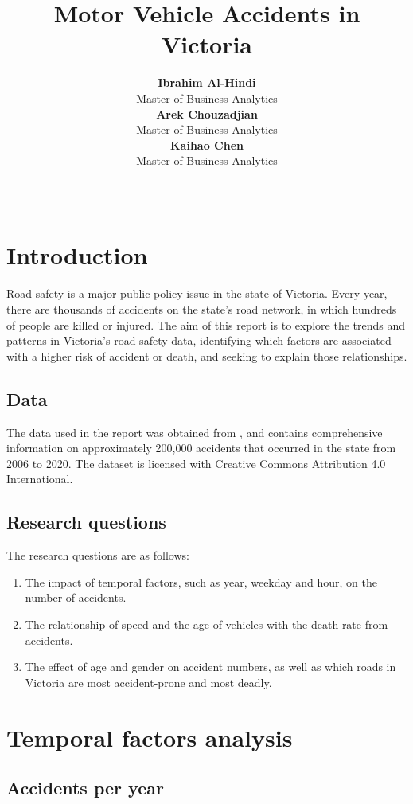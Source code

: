\documentclass[11pt,a4paper,]{article}
\title{Motor Vehicle Accidents in Victoria}
\author{\sf\Large\textbf{ Ibrahim Al-Hindi}\\ {\sf\large Master of Business Analytics\\[0.5cm]} \sf\Large\textbf{ Arek Chouzadjian}\\ {\sf\large Master of Business Analytics\\[0.5cm]} \sf\Large\textbf{ Kaihao Chen}\\ {\sf\large Master of Business Analytics\\[0.5cm]}}
\date{\sf\Date~\Month~\Year}
\makeatletter
\def\titlepage{\front{\expandafter{\@title}}{\@author}{\@organization}}
\makeatother
\begin{document}
\titlepage

\section*{Introduction}

Road safety is a major public policy issue in the state of Victoria. Every year, there are thousands of accidents on the state's road network, in which hundreds of people are killed or injured. The aim of this report is to explore the trends and patterns in Victoria's road safety data, identifying which factors are associated with a higher risk of accident or death, and seeking to explain those relationships.

\subsection*{Data}

The data used in the report was obtained from \textcite{vicroads}, and contains comprehensive information on approximately 200,000 accidents that occurred in the state from 2006 to 2020. The dataset is licensed with Creative Commons Attribution 4.0 International.

\subsection*{Research questions}

The research questions are as follows:

\begin{enumerate}
\def\labelenumi{\arabic{enumi}.}
\item
  The impact of temporal factors, such as year, weekday and hour, on the number of accidents.
\item
  The relationship of speed and the age of vehicles with the death rate from accidents.
\item
  The effect of age and gender on accident numbers, as well as which roads in Victoria are most accident-prone and most deadly.
\end{enumerate}

\section*{Temporal factors analysis}

\subsection*{Accidents per year}
\end{document}
